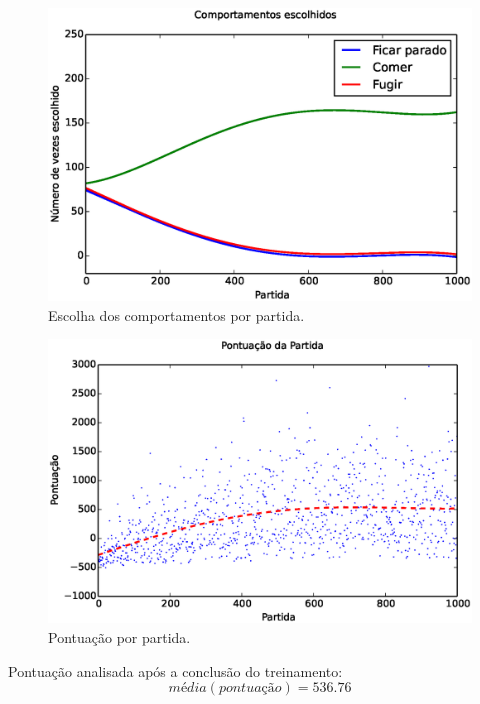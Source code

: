 \documentclass{beamer}
\begin{document}
\begin{frame}
\begin{figure}[H]
    \centering
    \includegraphics[width=\linewidth]{images/3_behaviors_original_map/chosen_behaviors_pol}
    \caption{Escolha dos comportamentos por partida.}
    \label{img:3ComportamentosMapaOriginal:ComportamentosEscolhidosPolinomio}
\end{figure}
\end{frame}


\begin{frame}
\begin{figure}[h]
    \centering
    \includegraphics[width=0.7\linewidth]{images/3_behaviors_original_map/match_scores____pol}
    \caption{Pontuação por partida.}
    \label{img:3ComportamentosMapaOriginal:PontuacaoPorPartida}
\end{figure}

Pontuação analisada após a conclusão do treinamento:
$$ \textit{média} \left( \textit{pontuação} \right) = 536.76 $$
\end{frame}
\end{document}
